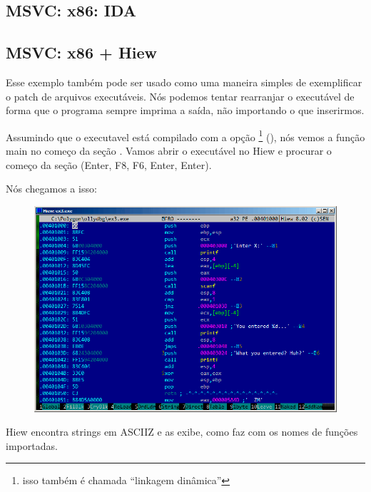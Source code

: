 \subsection{MSVC: x86: IDA}

\PTBRph{}

\ifdefined\IncludeOlly

\fi

\clearpage
\subsection{MSVC: x86 + Hiew}

Esse exemplo também pode ser usado como uma maneira simples de exemplificar o patch de arquivos executáveis.
Nós podemos tentar rearranjar o executável de forma que o programa sempre imprima a saída, não importando o que inserirmos.

Assumindo que o executavel está compilado com a opção \footnote{isso também é chamada ``linkagem dinâmica''}
(), nós vemos a função main no começo da seção .
Vamos abrir o executável no Hiew e procurar o começo da seção  (Enter, F8, F6, Enter, Enter).

Nós chegamos a isso:

\begin{figure}[H]
\centering
\includegraphics[scale=\FigScale]{patterns/04_scanf/3_checking_retval/hiew_1.png}
\caption{\PTBRph{}}
\label{fig:scanf_ex3_hiew_1}
\end{figure}

Hiew encontra strings em \ac{ASCIIZ} e as exibe, como faz com os nomes de funções importadas.

